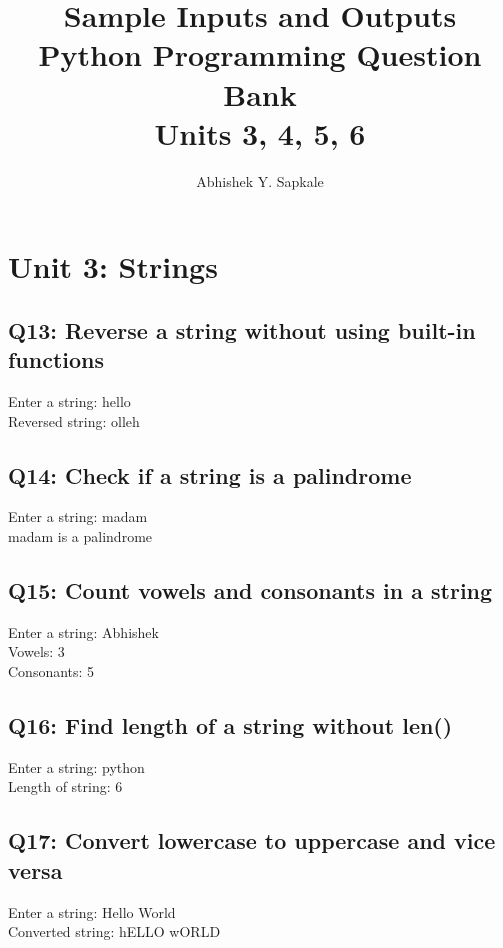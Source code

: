 \documentclass[11pt,a4paper]{article}
\title{Sample Inputs and Outputs \\ Python Programming Question Bank \\ Units 3, 4, 5, 6}
\author{Abhishek Y. Sapkale}
\date{}
\begin{document}
\maketitle
\tableofcontents
\newpage

\section{Unit 3: Strings}

\subsection{Q13: Reverse a string without using built-in functions}
\begin{outputbox}
Enter a string: hello\\
Reversed string: olleh
\end{outputbox}

\subsection{Q14: Check if a string is a palindrome}
\begin{outputbox}
Enter a string: madam\\
madam is a palindrome
\end{outputbox}

\subsection{Q15: Count vowels and consonants in a string}
\begin{outputbox}
Enter a string: Abhishek\\
Vowels: 3\\
Consonants: 5
\end{outputbox}

\subsection{Q16: Find length of a string without len()}
\begin{outputbox}
Enter a string: python\\
Length of string: 6
\end{outputbox}

\subsection{Q17: Convert lowercase to uppercase and vice versa}
\begin{outputbox}
Enter a string: Hello World\\
Converted string: hELLO wORLD
\end{outputbox}
\end{document}
